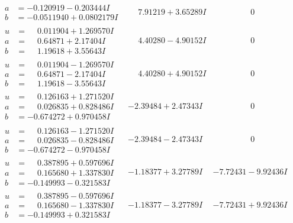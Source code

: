 \documentclass[1p]{elsarticle_modified}
\theoremstyle{definition}
\begin{document}
$$\begin{array}{c|c|c}
\begin{aligned}
a &= -0.120919 - 0.203444 I \\
b &= -0.0511940 + 0.0802179 I\end{aligned}
 & \phantom{-}7.91219 + 3.65289 I & \phantom{-0.000000 } 0 \\ \hline\begin{aligned}
u &= \phantom{-}0.011904 + 1.269570 I \\
a &= \phantom{-}0.64871 + 2.17404 I \\
b &= \phantom{-}1.19618 + 3.55643 I\end{aligned}
 & \phantom{-}4.40280 - 4.90152 I & \phantom{-0.000000 } 0 \\ \hline\begin{aligned}
u &= \phantom{-}0.011904 - 1.269570 I \\
a &= \phantom{-}0.64871 - 2.17404 I \\
b &= \phantom{-}1.19618 - 3.55643 I\end{aligned}
 & \phantom{-}4.40280 + 4.90152 I & \phantom{-0.000000 } 0 \\ \hline\begin{aligned}
u &= \phantom{-}0.126163 + 1.271520 I \\
a &= \phantom{-}0.026835 + 0.828486 I \\
b &= -0.674272 + 0.970458 I\end{aligned}
 & -2.39484 + 2.47343 I & \phantom{-0.000000 } 0 \\ \hline\begin{aligned}
u &= \phantom{-}0.126163 - 1.271520 I \\
a &= \phantom{-}0.026835 - 0.828486 I \\
b &= -0.674272 - 0.970458 I\end{aligned}
 & -2.39484 - 2.47343 I & \phantom{-0.000000 } 0 \\ \hline\begin{aligned}
u &= \phantom{-}0.387895 + 0.597696 I \\
a &= \phantom{-}0.165680 + 1.337830 I \\
b &= -0.149993 - 0.321583 I\end{aligned}
 & -1.18377 + 3.27789 I & -7.72431 - 9.92436 I \\ \hline\begin{aligned}
u &= \phantom{-}0.387895 - 0.597696 I \\
a &= \phantom{-}0.165680 - 1.337830 I \\
b &= -0.149993 + 0.321583 I\end{aligned}
 & -1.18377 - 3.27789 I & -7.72431 + 9.92436 I \\ \hline\begin{aligned}

\end{aligned}
\end{array}$$
\end{document}
